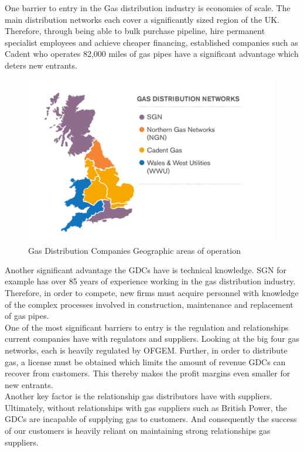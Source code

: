 \documentclass[11pt]{article}		%
\newlength{\imageheight}	 %
\newcommand{\supercite}[1]{\textsuperscript{\cite{#1}}}		%
\begin{document}
				One barrier to entry in the Gas distribution industry is economies of scale. The main distribution networks each cover a significantly sized region of the UK. Therefore, through being able to bulk purchase pipeline, hire permanent specialist employees and achieve cheaper financing, established companies such as Cadent who operates 82,000 miles of gas pipes have a significant advantage which deters new entrants. \\
					\begin{figure}[h]
			    \centering
		    	\includegraphics[height = \imageheight]{distribution}
			    \caption{Gas Distribution Companies Geographic areas of operation\supercite{sönnichsen_5_2021}}
		    	\label{distrit}
	        	\end{figure}
				
				Another significant advantage the GDCs  have is technical knowledge. SGN for example has over 85 years of experience working in the gas distribution industry. Therefore, in order to compete, new firms must acquire personnel with knowledge of the complex processes involved in construction, maintenance and replacement of gas pipes. \\
				One of the most significant barriers to entry is the regulation and relationships current companies have with regulators and suppliers. Looking at the big four gas networks, each is heavily regulated by OFGEM. Further, in order to distribute gas, a license must be obtained which limits the amount of revenue GDCs can recover from customers. This thereby makes the profit margins even smaller for new entrants. \\
	            \hspace*{3ex}Another key factor is the relationship gas distributors have with suppliers. Ultimately, without relationships with gas suppliers such as British Power, the GDCs are incapable of supplying gas to customers. And consequently the success of our customers is heavily reliant on maintaining strong relationships gas suppliers.
\end{document}
